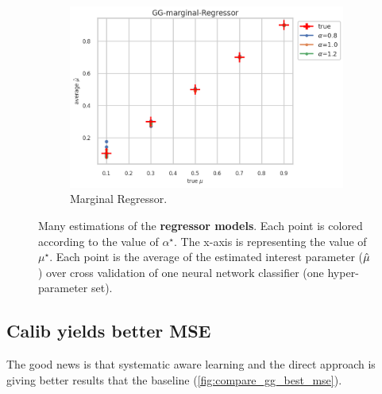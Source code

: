 \begin{figure}[ht!]
  \begin{subfigure}[t]{0.49\linewidth}
    \includegraphics[width=\linewidth]{COMPARE/GG-marginal/Regressor/profusion_true_mu_target_mean.png}
    \caption{Marginal Regressor.}
  \end{subfigure}%

  \caption{Many estimations of the \textbf{regressor models}. Each point is colored according to the value of $\alpha^\star$. The x-axis is representing the value of $\mu^\star$. Each point is the average of the estimated interest parameter ($\hat\mu$) over cross validation of one neural network classifier (one hyper-parameter set).}
  \label{fig:gg_regressor_compare_calib_estimator}
\end{figure}





\clearpage

\subsection{Calib yields better MSE}


The good news is that systematic aware learning and the direct approach is giving better results that the baseline (\autoref{fig:compare_gg_best_mse}).

